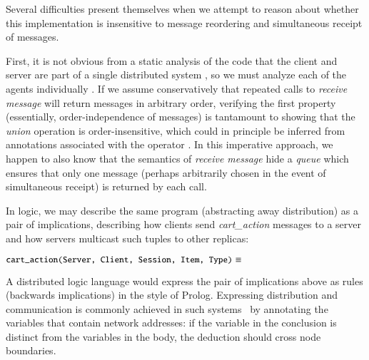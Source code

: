 Several difficulties present themselves when we attempt to reason about whether
this implementation is insensitive to message reordering and simultaneous receipt of messages.  

First, it is not obvious from a static analysis of the code that the client and server are
part of a single distributed system , so we must analyze each of the agents individually . 
If we assume conservatively that repeated calls to {\em receive message} will return messages in
arbitrary order, verifying the first property (essentially, order-independence of messages)
is tantamount to showing that the {\em union} operation is
order-insensitive, which could in principle be inferred from annotations associated
with the operator .
In this imperative approach, we happen to also know that the semantics of {\em receive message}
hide a {\em queue} which ensures that only one message (perhaps arbitrarily chosen in the
event of simultaneous receipt) is returned by each call.


In logic, we may describe the same program (abstracting away distribution)
as a pair of implications, describing how clients send {\em cart\_action}
messages to a server and how servers multicast such tuples to other replicas:


$\dedalus{cart\_action(Server, Client, Session, Item, Type)} \equiv $

A distributed logic language would express the pair of implications above as rules
(backwards implications) in the style of Prolog.  Expressing distribution and communication
is commonly achieved in such systems~\cite{loo-sigmod06} by annotating the variables that 
contain network addresses: if the variable in the conclusion is distinct from the variables in
the body, the deduction should cross node boundaries.  

